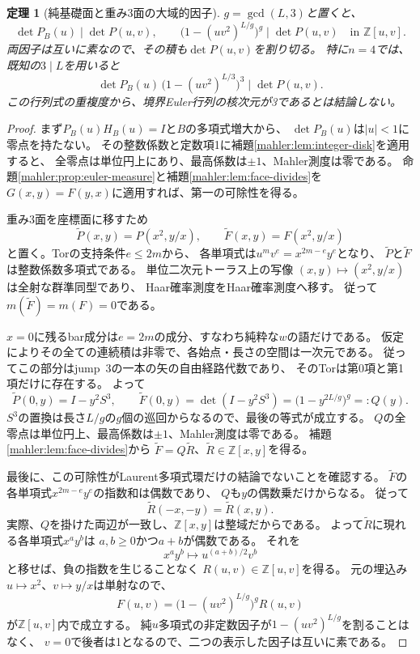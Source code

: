\documentclass[11pt,a4paper]{ltjsarticle}
\newtheorem{theorem}{定理}[section]
\theoremstyle{definition}
\begin{document}
\begin{theorem}[純基礎面と重み3面の大域的因子]
\label{mahler:thm:two-faces}
$g=\gcd(L,3)$と置くと、
\[
 \det P_B(u)\mid\det P(u,v),
 \qquad
 \bigl(1-(uv^2)^{L/g}\bigr)^g\mid\det P(u,v)
 \quad\text{in }\mathbb Z[u,v].
\]
両因子は互いに素なので、その積も$\det P(u,v)$を割り切る。
特に$n=4$では、既知の$3\mid L$を用いると
\[
 \det P_B(u)\,
 \bigl(1-(uv^2)^{L/3}\bigr)^3\mid\det P(u,v).
\]
この行列式の重複度から、境界Euler行列の核次元が3であるとは結論しない。
\end{theorem}
\begin{proof}
まず$P_B(u)H_B(u)=I$と$B$の多項式増大から、
$\det P_B(u)$は$|u|<1$に零点を持たない。
その整数係数と定数項1に補題\ref{mahler:lem:integer-disk}を適用すると、
全零点は単位円上にあり、最高係数は$\pm1$、Mahler測度は零である。
命題\ref{mahler:prop:euler-measure}と補題\ref{mahler:lem:face-divides}を
$G(x,y)=F(y,x)$に適用すれば、第一の可除性を得る。

重み3面を座標面に移すため
\[
 \widetilde P(x,y)=P(x^2,y/x),\qquad
 \widetilde F(x,y)=F(x^2,y/x)
\]
と置く。Torの支持条件$e\le2m$から、
各単項式は$u^mv^e=x^{2m-e}y^e$となり、
$\widetilde P$と$\widetilde F$は整数係数多項式である。
単位二次元トーラス上の写像
$(x,y)\mapsto(x^2,y/x)$は全射な群準同型であり、
Haar確率測度をHaar確率測度へ移す。
従って$m(\widetilde F)=m(F)=0$である。

$x=0$に残るbar成分は$e=2m$の成分、すなわち純粋な$w$の語だけである。
仮定によりその全ての連続積は非零で、各始点・長さの空間は一次元である。
従ってこの部分はjump~3の一本の矢の自由経路代数であり、
そのTorは第0項と第1項だけに存在する。
よって
\[
 \widetilde P(0,y)=I-y^2S^3,\qquad
 \widetilde F(0,y)=\det(I-y^2S^3)
              =\bigl(1-y^{2L/g}\bigr)^g=:Q(y).
\]
$S^3$の置換は長さ$L/g$の$g$個の巡回からなるので、最後の等式が成立する。
$Q$の全零点は単位円上、最高係数は$\pm1$、Mahler測度は零である。
補題\ref{mahler:lem:face-divides}から
$\widetilde F=Q\widetilde R$、$\widetilde R\in\mathbb Z[x,y]$を得る。

最後に、この可除性がLaurent多項式環だけの結論でないことを確認する。
$\widetilde F$の各単項式$x^{2m-e}y^e$の指数和は偶数であり、
$Q$も$y$の偶数乗だけからなる。
従って
\[
 \widetilde R(-x,-y)=\widetilde R(x,y).
\]
実際、$Q$を掛けた両辺が一致し、$\mathbb Z[x,y]$は整域だからである。
よって$\widetilde R$に現れる各単項式$x^ay^b$は
$a,b\ge0$かつ$a+b$が偶数である。
それを
\[
 x^ay^b\longmapsto u^{(a+b)/2}v^b
\]
と移せば、負の指数を生じることなく
$R(u,v)\in\mathbb Z[u,v]$を得る。
元の埋込み$u\mapsto x^2$、$v\mapsto y/x$は単射なので、
\[
 F(u,v)=\bigl(1-(uv^2)^{L/g}\bigr)^gR(u,v)
\]
が$\mathbb Z[u,v]$内で成立する。
純$u$多項式の非定数因子が$1-(uv^2)^{L/g}$を割ることはなく、
$v=0$で後者は1となるので、二つの表示した因子は互いに素である。
\end{proof}
\end{document}
